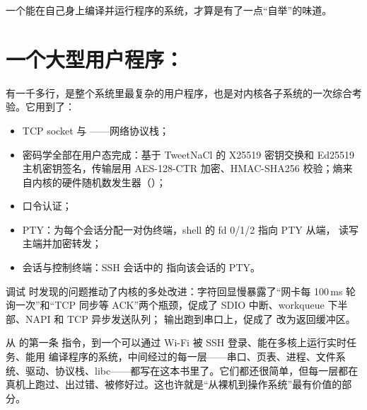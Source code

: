 一个能在自己身上编译并运行程序的系统，才算是有了一点“自举”的味道。

\section{一个大型用户程序：}

 有一千多行，是整个系统里最复杂的用户程序，也是对内核各子系统的一次综合考验。它用到了：

\begin{itemize}
  \item TCP socket 与 ——网络协议栈；
  \item 密码学全部在用户态完成：基于 TweetNaCl\cite{tweetnacl} 的 X25519 密钥交换和 Ed25519 主机密钥签名，传输层用 AES-128-CTR 加密、HMAC-SHA256 校验；熵来自内核的硬件随机数发生器（）；
  \item {} 口令认证；
  \item PTY：为每个会话分配一对伪终端，shell 的 fd 0/1/2 指向 PTY 从端， 读写主端并加密转发；
  \item 会话与控制终端：SSH 会话中的  指向该会话的 PTY。
\end{itemize}

调试  时发现的问题推动了内核的多处改进：字符回显慢暴露了“网卡每 100\,ms 轮询一次”和“TCP  同步等 ACK”两个瓶颈，促成了 SDIO 中断、workqueue 下半部、NAPI 和 TCP 异步发送队列； 输出跑到串口上，促成了  改为返回缓冲区。

\begin{remark}
  从  的第一条  指令，到一个可以通过 Wi-Fi 被 SSH 登录、能在多核上运行实时任务、能用  编译程序的系统，中间经过的每一层——串口、页表、进程、文件系统、驱动、协议栈、libc——都写在这本书里了。它们都还很简单，但每一层都在真机上跑过、出过错、被修好过。这也许就是“从裸机到操作系统”最有价值的部分。
\end{remark}
